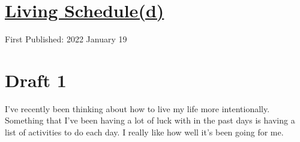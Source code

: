 \documentclass[12pt]{article}[titlepage]
\newcommand{\1}{\={a}}
\newcommand{\2}{\={e}}
\newcommand{\3}{\={\i}}
\newcommand{\4}{\=o}
\newcommand{\5}{\=u}
\newcommand{\6}{\={A}}
\renewcommand{\,}{\textsuperscript{,}}
\begin{document}
\doublespacing
\section{\href{living-scheduled.html}{Living Schedule(d)}}
First Published: 2022 January 19

\section{Draft 1}
I've recently been thinking about how to live my life more intentionally.
Something that I've been having a lot of luck with in the past days is having a list of activities to do each day.
I really like how well it's been going for me.
\end{document}
